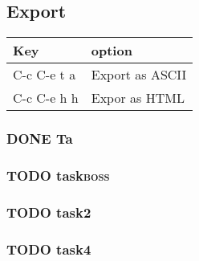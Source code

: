 \documentclass[11pt]{article}
\begin{document}
\subsection{Export}
\label{sec:org1c93a77}
\begin{center}
\begin{tabular}{ll}
Key & option\\
\hline
C-c C-e t a & Export as ASCII\\
C-c C-e h h & Expor as HTML\\
\hline
\end{tabular}
\end{center}
\subsubsection{{\bfseries\sffamily DONE} Ta}
\label{sec:orgf6c39ad}
\subsubsection{{\bfseries\sffamily TODO} task\hfill{}\textsc{boss}}
\label{sec:orgcffa0ab}
\subsubsection{{\bfseries\sffamily TODO} task2}
\label{sec:org09f5fbc}
\subsubsection{{\bfseries\sffamily TODO} task4}
\label{sec:org838f546}
\end{document}
